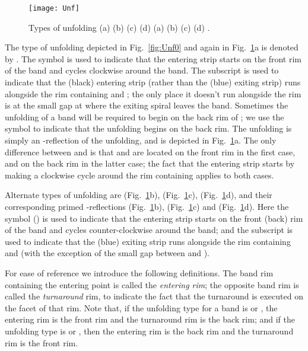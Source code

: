 \documentclass[11pt]{article}
\begin{document}
\begin{figure}[htbp]
\centering
\texttt{[image: Unf]}
\caption{Types of unfolding (a)  (b)  (c)  (d)  (a)  (b)  (c)  (d) .}
\label{fig:Unf}
\end{figure}


The type of unfolding depicted in Fig.~\ref{fig:Unf0} and again in Fig.~\ref{fig:Unf}a is denoted by . The symbol  is used to indicate that the entering strip starts on the front rim of the band and cycles clockwise around the band. The subscript  is used to indicate that the (black)
entering strip (rather than the (blue) exiting strip) runs alongside the rim containing  and ; the only place it doesn't run alongside the rim is at the small gap at  where the exiting spiral leaves the band.
Sometimes the unfolding of a band  will be required to begin on the back rim of ; we use the symbol  to indicate that the unfolding begins on the back rim. The  unfolding is simply an -reflection of the  unfolding, and is depicted in Fig.~\ref{fig:Unf}a. The only difference between  and  is that  and  are located on the front rim in the first case, and on the back rim in the latter case; the fact that the entering strip starts by making a clockwise cycle around the rim containing  applies to both cases.

Alternate types of unfolding are  (Fig.~\ref{fig:Unf}b),  (Fig.~\ref{fig:Unf}c),  (Fig.~\ref{fig:Unf}d), and their corresponding primed -reflections  (Fig.~\ref{fig:Unf}b),  (Fig.~\ref{fig:Unf}c) and  (Fig.~\ref{fig:Unf}d). Here the symbol  () is used to indicate that the entering strip starts on the front (back) rim of the band and cycles counter-clockwise around the band; and the subscript  is used to indicate that
the (blue) exiting strip runs alongside the rim containing  and  (with the exception of the small gap between  and ).


For ease of reference we introduce the following definitions. The band rim containing the entering point  is called the \emph{entering rim}; the opposite band rim is called the \emph{turnaround} rim, to indicate the fact that the turnaround is executed on the facet of that rim. Note that, if the unfolding type for a band is  or , the entering rim is the front rim and the turnaround rim is the back rim; and if the unfolding type is  or , then the entering rim is the back rim and the turnaround rim is the front rim. 
\end{document}
